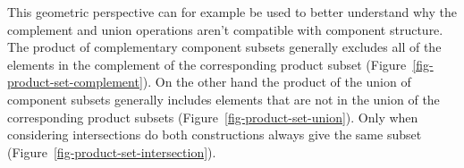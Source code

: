 \documentclass[
  letterpaper,
  DIV=11,
  numbers=noendperiod]{scrartcl}
\begin{document}
This geometric perspective can for example be used to better understand
why the complement and union operations aren't compatible with component
structure. The product of complementary component subsets generally
excludes all of the elements in the complement of the corresponding
product subset (Figure~\ref{fig-product-set-complement}). On the other
hand the product of the union of component subsets generally includes
elements that are not in the union of the corresponding product subsets
(Figure~\ref{fig-product-set-union}). Only when considering
intersections do both constructions always give the same subset
(Figure~\ref{fig-product-set-intersection}).

\begin{figure}

\begin{minipage}[t]{0.10\linewidth}

{\centering 

~

}

\end{minipage}%
%
\begin{minipage}[t]{0.80\linewidth}

{\centering 


}

\subcaption{\label{fig-pc}}
\end{minipage}%
%
\begin{minipage}[t]{0.10\linewidth}

{\centering 

}
\end{minipage}
\end{figure}
\end{document}
